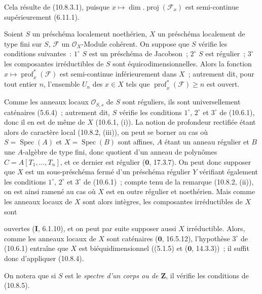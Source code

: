 Cela résulte de (10.8.3.1), puisque
$x\mapsto\dim.\operatorname{proj}(\mathcal F_x)$ est semi-continue supérieurement
(6.11.1).

\begin{proposition}[10.8.5]
\label{IV.10.8.5-fr}
Soient $S$ un préschéma localement noethérien, $X$ un préschéma localement de
type fini sur $S$, $\mathcal F$ un $\mathcal O_X$-Module cohérent. On suppose que $S$
vérifie les conditions suivantes~: $1^\circ$ $S$ est un préschéma de Jacobson~;
$2^\circ$ $S$ est régulier~; $3^\circ$ les composantes irréductibles de $S$ sont
équicodimensionnelles. Alors la fonction
$x\mapsto\operatorname{prof}^{*}_{x}(\mathcal F)$ est semi-continue inférieurement
dans $X$~; autrement dit, pour tout entier $n$, l'ensemble $U_n$ des $x\in X$
tels que $\operatorname{prof}^{*}_{x}(\mathcal F)\geq n$ est ouvert.
\end{proposition}

Comme les anneaux locaux $\mathcal O_{S,s}$ de $S$ sont réguliers, ils sont
universellement caténaires (5.6.4)~; autrement dit, $S$ vérifie les conditions
$1^\circ$, $2^\circ$ et $3^\circ$ de (10.6.1), donc il en est de même de $X$
(10.6.1, (i)). La notion de profondeur rectifiée étant alors de caractère local
(10.8.2, (iii)), on peut se borner au cas où $S=\operatorname{Spec}(A)$ et
$X=\operatorname{Spec}(B)$ sont affines, $A$ étant un anneau régulier et $B$ une
$A$-algèbre de type fini, donc quotient d'un anneau de polynômes
$C=A[T_1,\ldots,T_n]$, et ce dernier est régulier ($\mathbf 0$, 17.3.7). On peut
donc supposer que $X$ est un sous-préschéma fermé d'un préschéma régulier $Y$
vérifiant également les conditions $1^\circ$, $2^\circ$ et $3^\circ$ de (10.6.1)~;
compte tenu de la remarque (10.8.2, (ii)), on est ainsi ramené au cas où $X$ est
en outre régulier et noethérien. Mais comme les anneaux locaux de $X$ sont alors
intègres, les composantes irréductibles de $X$ sont

ouvertes (\textbf{I}, 6.1.10), et on peut par suite supposer aussi $X$
irréductible. Alors, comme les anneaux locaux de $X$ sont caténaires
($\mathbf 0$, 16.5.12), l'hypothèse $3^\circ$ de (10.6.1) entraîne que $X$ est
biéquidimensionnel ((5.1.5) et ($\mathbf 0$, 14.3.3))~; il suffit donc d'appliquer
(10.8.4).

On notera que si $S$ est le \emph{spectre d'un corps ou de $\mathbf Z$}, il
vérifie les conditions de (10.8.5).

